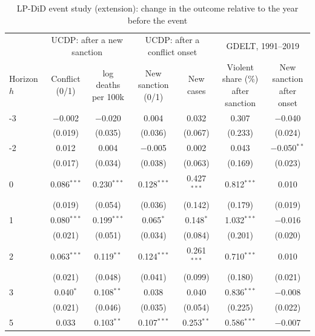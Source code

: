 \begin{table}[htbp]
\centering
\footnotesize\setlength{\tabcolsep}{4pt}
\caption{LP-DiD event study (extension): change in the outcome relative to the year before the event}
\label{tab:lpdid}
\begin{threeparttable}
\begin{tabular}{lcccccc}
\toprule
 & \multicolumn{2}{c}{UCDP: after a new sanction} & \multicolumn{2}{c}{UCDP: after a conflict onset} & \multicolumn{2}{c}{GDELT, 1991--2019} \\
\cmidrule(lr){2-3}\cmidrule(lr){4-5}\cmidrule(lr){6-7}
Horizon $h$ & \makecell{Conflict\\(0/1)} & \makecell{log deaths\\per 100k} & \makecell{New sanction\\(0/1)} & \makecell{New\\cases} & \makecell{Violent share (\%)\\after sanction} & \makecell{New sanction\\after onset} \\
\midrule
-3 & $-$0.002 & $-$0.020 & 0.004 & 0.032 & 0.307 & $-$0.040 \\
 & (0.019) & (0.035) & (0.036) & (0.067) & (0.233) & (0.024) \\
-2 & 0.012 & 0.004 & $-$0.005 & 0.002 & 0.043 & $-$0.050$^{**}$ \\
 & (0.017) & (0.034) & (0.038) & (0.063) & (0.169) & (0.023) \\
\midrule
0 & 0.086$^{***}$ & 0.230$^{***}$ & 0.128$^{***}$ & 0.427$^{***}$ & 0.812$^{***}$ & 0.010 \\
 & (0.019) & (0.054) & (0.036) & (0.142) & (0.179) & (0.019) \\
1 & 0.080$^{***}$ & 0.199$^{***}$ & 0.065$^{*}$ & 0.148$^{*}$ & 1.032$^{***}$ & $-$0.016 \\
 & (0.021) & (0.051) & (0.034) & (0.084) & (0.201) & (0.020) \\
2 & 0.063$^{***}$ & 0.119$^{**}$ & 0.124$^{***}$ & 0.261$^{***}$ & 0.710$^{***}$ & 0.010 \\
 & (0.021) & (0.048) & (0.041) & (0.099) & (0.180) & (0.021) \\
3 & 0.040$^{*}$ & 0.108$^{**}$ & 0.038 & 0.040 & 0.836$^{***}$ & $-$0.008 \\
 & (0.021) & (0.046) & (0.035) & (0.054) & (0.225) & (0.022) \\
5 & 0.033 & 0.103$^{**}$ & 0.107$^{***}$ & 0.253$^{**}$ & 0.586$^{***}$ & $-$0.007 \\

\end{tabular}
\end{threeparttable}
\end{table}
